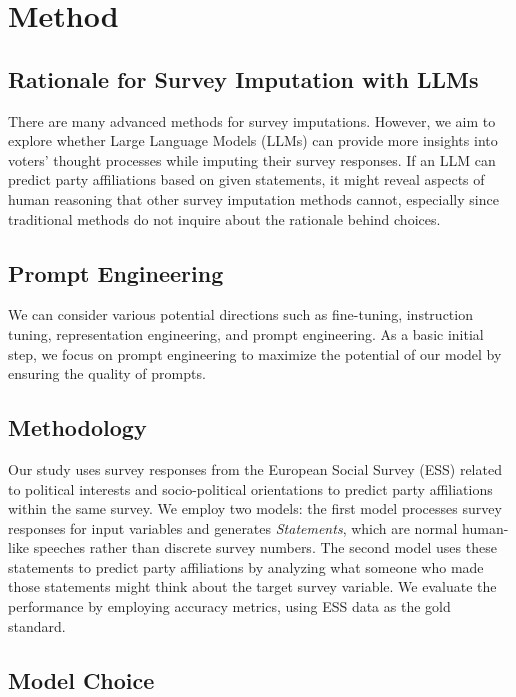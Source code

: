 \section{Method}

\subsection*{Rationale for Survey Imputation with LLMs}

There are many advanced methods for survey imputations. However, we aim to explore whether Large Language Models (LLMs) can provide more insights into voters' thought processes while imputing their survey responses. If an LLM can predict party affiliations based on given statements, it might reveal aspects of human reasoning that other survey imputation methods cannot, especially since traditional methods do not inquire about the rationale behind choices.

\subsection*{Prompt Engineering}

We can consider various potential directions such as fine-tuning, instruction tuning, representation engineering, and prompt engineering. As a basic initial step, we focus on prompt engineering to maximize the potential of our model by ensuring the quality of prompts.

\subsection*{Methodology}

Our study uses survey responses from the European Social Survey (ESS) related to political interests and socio-political orientations to predict party affiliations within the same survey. We employ two models: the first model processes survey responses for input variables and generates \textit{Statements}, which are normal human-like speeches rather than discrete survey numbers. The second model uses these statements to predict party affiliations by analyzing what someone who made those statements might think about the target survey variable. We evaluate the performance by employing accuracy metrics, using ESS data as the gold standard.

\subsection*{Model Choice}


